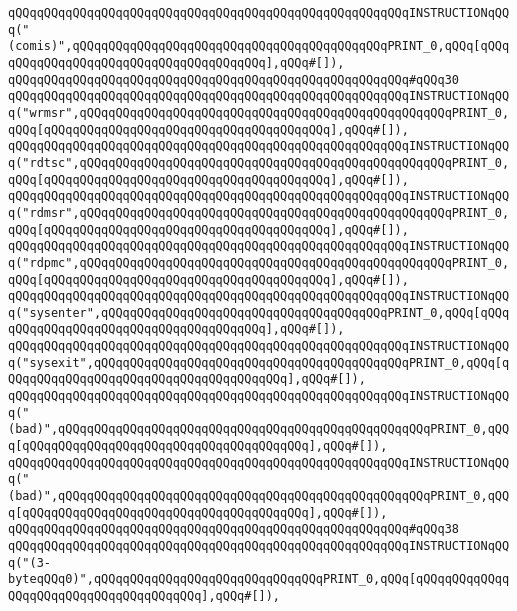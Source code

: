 \verb|qQQqqQQqqQQqqQQqqQQqqQQqqQQqqQQqqQQqqQQqqQQqqQQqqQQqqQQqINSTRUCTIONqQQq("(comis)",qQQqqQQqqQQqqQQqqQQqqQQqqQQqqQQqqQQqqQQqqQQqPRINT_0,qQQq[qQQqqQQqqQQqqQQqqQQqqQQqqQQqqQQqqQQqqQQq],qQQq#[]),|\newline
\verb|qQQqqQQqqQQqqQQqqQQqqQQqqQQqqQQqqQQqqQQqqQQqqQQqqQQqqQQq#qQQq30|\newline
\verb|qQQqqQQqqQQqqQQqqQQqqQQqqQQqqQQqqQQqqQQqqQQqqQQqqQQqqQQqINSTRUCTIONqQQq("wrmsr",qQQqqQQqqQQqqQQqqQQqqQQqqQQqqQQqqQQqqQQqqQQqqQQqqQQqPRINT_0,qQQq[qQQqqQQqqQQqqQQqqQQqqQQqqQQqqQQqqQQqqQQq],qQQq#[]),|\newline
\verb|qQQqqQQqqQQqqQQqqQQqqQQqqQQqqQQqqQQqqQQqqQQqqQQqqQQqqQQqINSTRUCTIONqQQq("rdtsc",qQQqqQQqqQQqqQQqqQQqqQQqqQQqqQQqqQQqqQQqqQQqqQQqqQQqPRINT_0,qQQq[qQQqqQQqqQQqqQQqqQQqqQQqqQQqqQQqqQQqqQQq],qQQq#[]),|\newline
\verb|qQQqqQQqqQQqqQQqqQQqqQQqqQQqqQQqqQQqqQQqqQQqqQQqqQQqqQQqINSTRUCTIONqQQq("rdmsr",qQQqqQQqqQQqqQQqqQQqqQQqqQQqqQQqqQQqqQQqqQQqqQQqqQQqPRINT_0,qQQq[qQQqqQQqqQQqqQQqqQQqqQQqqQQqqQQqqQQqqQQq],qQQq#[]),|\newline
\verb|qQQqqQQqqQQqqQQqqQQqqQQqqQQqqQQqqQQqqQQqqQQqqQQqqQQqqQQqINSTRUCTIONqQQq("rdpmc",qQQqqQQqqQQqqQQqqQQqqQQqqQQqqQQqqQQqqQQqqQQqqQQqqQQqPRINT_0,qQQq[qQQqqQQqqQQqqQQqqQQqqQQqqQQqqQQqqQQqqQQq],qQQq#[]),|\newline
\verb|qQQqqQQqqQQqqQQqqQQqqQQqqQQqqQQqqQQqqQQqqQQqqQQqqQQqqQQqINSTRUCTIONqQQq("sysenter",qQQqqQQqqQQqqQQqqQQqqQQqqQQqqQQqqQQqqQQqPRINT_0,qQQq[qQQqqQQqqQQqqQQqqQQqqQQqqQQqqQQqqQQqqQQq],qQQq#[]),|\newline
\verb|qQQqqQQqqQQqqQQqqQQqqQQqqQQqqQQqqQQqqQQqqQQqqQQqqQQqqQQqINSTRUCTIONqQQq("sysexit",qQQqqQQqqQQqqQQqqQQqqQQqqQQqqQQqqQQqqQQqqQQqPRINT_0,qQQq[qQQqqQQqqQQqqQQqqQQqqQQqqQQqqQQqqQQqqQQq],qQQq#[]),|\newline
\verb|qQQqqQQqqQQqqQQqqQQqqQQqqQQqqQQqqQQqqQQqqQQqqQQqqQQqqQQqINSTRUCTIONqQQq("(bad)",qQQqqQQqqQQqqQQqqQQqqQQqqQQqqQQqqQQqqQQqqQQqqQQqqQQqPRINT_0,qQQq[qQQqqQQqqQQqqQQqqQQqqQQqqQQqqQQqqQQqqQQq],qQQq#[]),|\newline
\verb|qQQqqQQqqQQqqQQqqQQqqQQqqQQqqQQqqQQqqQQqqQQqqQQqqQQqqQQqINSTRUCTIONqQQq("(bad)",qQQqqQQqqQQqqQQqqQQqqQQqqQQqqQQqqQQqqQQqqQQqqQQqqQQqPRINT_0,qQQq[qQQqqQQqqQQqqQQqqQQqqQQqqQQqqQQqqQQqqQQq],qQQq#[]),|\newline
\verb|qQQqqQQqqQQqqQQqqQQqqQQqqQQqqQQqqQQqqQQqqQQqqQQqqQQqqQQq#qQQq38|\newline
\verb|qQQqqQQqqQQqqQQqqQQqqQQqqQQqqQQqqQQqqQQqqQQqqQQqqQQqqQQqINSTRUCTIONqQQq("(3-byteqQQq0)",qQQqqQQqqQQqqQQqqQQqqQQqqQQqqQQqPRINT_0,qQQq[qQQqqQQqqQQqqQQqqQQqqQQqqQQqqQQqqQQqqQQq],qQQq#[]),|\newline
